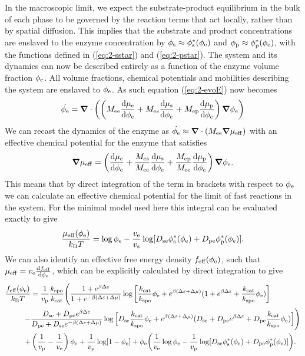In the macroscopic limit, we expect the substrate-product equilibrium in the bulk of each phase to be governed by the reaction terms that act locally, rather than by spatial diffusion. This implies that the substrate and product concentrations are enslaved to the enzyme concentration by $\phi_{\mathrm{s}} \approx \phi_{\mathrm{s}}^*(\phi_{\mathrm{e}})$ and $\phi_{\mathrm{p}} \approx \phi_{\mathrm{p}}^*(\phi_{\mathrm{e}})$, with the functions defined in (\ref{eq:2-sstar}) and (\ref{eq:2-pstar}). The system and its dynamics can now be described entirely as a function of the enzyme volume fraction $\phi_{\mathrm{e}}$. All volume fractions, chemical potentials and mobilities describing the system are enslaved to $\phi_{\mathrm{e}}$. As such equation (\ref{eq:2-evoE}) now becomes
\begin{equation}
    \dot{\phi_{\mathrm{e}}} = \bm{\nabla} \cdot \left(\left(M_{\mathrm{ee}}\frac{\mathrm{d}\mu_{\mathrm{e}}}{\mathrm{d}\phi_{\mathrm{e}}} + M_{\mathrm{es}}\frac{\mathrm{d}\mu_{\mathrm{s}}}{\mathrm{d}\phi_{\mathrm{e}}} + M_{\mathrm{ep}}\frac{\mathrm{d}\mu_{\mathrm{p}}}{\mathrm{d}\phi_{\mathrm{e}}}\right)\bm{\nabla}\phi_{\mathrm{e}}\right)
\end{equation}
We can recast the dynamics of the enzyme as $\dot{\phi_{\mathrm{e}}}\approx \bm{\nabla} \cdot (M_{\mathrm{ee}}\bm{\nabla}\mu_\mathrm{eff})$ with an effective chemical potential for the enzyme that satisfies
\begin{equation}
    \bm{\nabla}\mu_\mathrm{eff} = \left(\frac{\text{d}\mu_{\mathrm{e}}}{\text{d}\phi_{\mathrm{e}}} + \frac{M_{\mathrm{es}}}{M_{\mathrm{ee}}}\frac{\text{d}\mu_{\mathrm{s}}}{\text{d}\phi_{\mathrm{e}}} + \frac{M_{\mathrm{ep}}}{M_{\mathrm{ee}}}\frac{\text{d}\mu_{\mathrm{p}}}{\text{d}\phi_{\mathrm{e}}}\right)\bm{\nabla}\phi_{\mathrm{e}}.
\end{equation}
This means that by direct integration of the term in brackets with respect to $\phi_{\mathrm{e}}$ we can calculate an effective chemical potential for the limit of fast reactions in the system. For the minimal model used here this integral can be evaluated exactly to give
\begin{equation}
    \frac{\mu_\mathrm{eff}(\phi_{\mathrm{e}})}{k_{\rm B} T} =  \log \phi_{\mathrm{e}} - \frac{v_{\mathrm{e}}}{v_{\mathrm{s}}} \log[D_{\mathrm{se}} \phi_{\mathrm{s}}^* (\phi_{\mathrm{e}}) + D_{\mathrm{pe}} \phi_{\mathrm{p}}^*(\phi_{\mathrm{e}})].
\end{equation}
We can also identify an effective free energy density $f_\mathrm{eff}(\phi_{\mathrm{e}})$, such that $\mu_\mathrm{eff}=v_{\mathrm{e}}\frac{\mathrm{d} f_\mathrm{eff}}{\mathrm{d} \phi_{\mathrm{e}}}$, which can be explicitly calculated by direct integration to give
\begin{equation}
\begin{split}
    \frac{f_\mathrm{eff}(\phi_{\mathrm{e}})}{k_{\rm B} T} &= \frac{1}{v_{\mathrm{p}}}\frac{k_{\mathrm{spo}}}{k_{\mathrm{cat}}}\Bigg(\frac{1+e^{\beta \Delta \varepsilon}}{1+e^{-\beta (\Delta \varepsilon + \Delta \mu)}}\log\left[\frac{k_{\mathrm{cat}}}{k_{\mathrm{spo}}}\phi_{\mathrm{e}} + e^{\beta (\Delta \varepsilon + \Delta \mu)}(1+e^{\beta \Delta \varepsilon} + \frac{k_{\mathrm{cat}}}{k_{\mathrm{spo}}}\phi_{\mathrm{e}})\right] \\
    -& \frac{D_{\mathrm{se}}+D_{\mathrm{pe}} e^{\beta \Delta \varepsilon}}{D_{\mathrm{pe}}+D_{\mathrm{se}} e^{-\beta (\Delta \varepsilon + \Delta \mu)}}\log\Big[D_{\mathrm{se}}\frac{k_{\mathrm{cat}}}{k_{\mathrm{spo}}}\phi_{\mathrm{e}} + e^{\beta (\Delta \varepsilon + \Delta \mu)}(D_{\mathrm{se}}+D_{\mathrm{pe}} e^{\beta \Delta \varepsilon} + D_{\mathrm{pe}} \frac{k_{\mathrm{cat}}}{k_{\mathrm{spo}}}\phi_{\mathrm{e}})\Big]\Bigg) \\
    +&\left(\frac{1}{v_{\mathrm{p}}}-\frac{1}{v_{\mathrm{e}}}\right)\phi_{\mathrm{e}} + \frac{1}{v_{\mathrm{p}}}\log[1-\phi_{\mathrm{e}}] + \phi_{\mathrm{e}}\bigg(\frac{1}{v_{\mathrm{e}}}\log\phi_{\mathrm{e}} - \frac{1}{v_{\mathrm{p}}} \log[D_{\mathrm{se}}\phi_{\mathrm{s}}^*(\phi_{\mathrm{e}})+D_{\mathrm{pe}}\phi_{\mathrm{p}}^*(\phi_{\mathrm{e}})]\bigg).
\end{split}
\end{equation}

